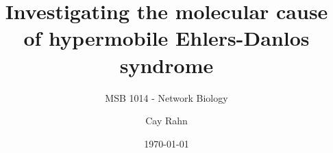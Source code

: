\documentclass[onecolumn, a4paper,11pt, headings=small]{scrreport}
\begin{document}
\author{Cay Rahn}
\date{\today}
\title{Investigating the molecular cause of hypermobile Ehlers-Danlos syndrome}
\subtitle{MSB 1014 - Network Biology}

\maketitle

\tableofcontents
\clearpage








\end{document}
